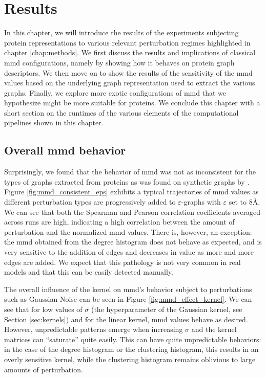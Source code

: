 \chapter{Results}\label{chap:results}

In this chapter, we will introduce the results of the experiments subjecting
protein representations to various relevant perturbation regimes highlighted in
chapter \ref{chap:methods}. We first discuss the results and implications of
classical \acrshort{mmd} configurations, namely by showing how it behaves on protein
graph descriptors. We then move on to show the results of the sensitivity of the \acrshort{mmd}
values based on the underlying graph representation used to extract the various
graphs. Finally, we explore more exotic configurations of \acrshort{mmd} that we
hypothesize might be more suitable for proteins. We conclude this chapter with a
short section on the runtimes of the various elements of the computational
pipelines shown in this chapter.

\section{Overall \acrshort{mmd} behavior}

Surprisingly, we found that the behavior of \acrshort{mmd} was not as inconsistent for the
types of graphs extracted from proteins as was found on synthetic graphs by
\cite{o2021evaluation}. Figure \ref{fig:mmd_consistent_eps} exhibits a typical
trajectories of \acrshort{mmd} values as different perturbation types are progressively
added to $\varepsilon$-graphs with $\varepsilon$ set to $8$\si{\angstrom}. We
can see that both the Spearman and Pearson correlation coefficients averaged
across runs are high, indicating a high correlation between the amount of
perturbation and the normalized \acrshort{mmd} values. There is, however, an exception: the
\acrshort{mmd} obtained from the degree histogram does not behave as expected, and is very
sensitive to the addition of edges and decreases in value as more and more edges
are added. We expect that this pathology is not very common in real models and
that this can be easily detected manually.

The overall influence of the kernel on \acrshort{mmd}'s behavior subject to perturbations
such as Gaussian Noise can be seen in Figure \ref{fig:mmd_effect_kernel}. We
can see that for low values of $\sigma$ (the hyperparameter of the Gaussian
kernel, see Section \ref{sec:kernels}) and for the linear kernel, \acrshort{mmd} values
behave as desired. However, unpredictable patterns emerge when increasing
$\sigma$ and the kernel matrices can ``saturate'' quite easily. This can have
quite unpredictable behaviors: in the case of the degree histogram or the
clustering histogram, this results in an overly sensitive kernel, while the
clustering histogram remains oblivious to large amounts of perturbation.

